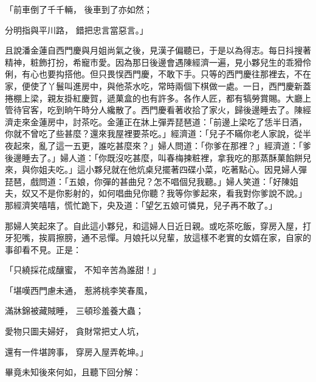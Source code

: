 \begin{showcontents}{}
「前車倒了千千輛，  後車到了亦如然；

分明指與平川路，  錯把忠言當惡言。」

且說潘金蓮自西門慶與月姐尚氣之後，見漢子偏聽已，于是以為得志。每日抖搜著精神，粧飾打扮，希寵巿愛。因為那日後邊會遇陳經濟一遍，見小夥兒生的乖猾伶俐，有心也要抅搭他。但只畏悮西門慶，不敢下手。只等的西門慶往那裡去，不在家，便使了丫鬟叫進房中，與他茶水吃，常時兩個下棋做一處。一日，西門慶新蓋捲棚上梁，親友掛紅慶賀，遞菓盒的也有許多。各作人匠，都有犒勞賞賜。大廳上管待官客，吃到晌午時分人纔散了。西門慶看著收拾了家火，歸後邊睡去了。陳經濟走來金蓮房中，討茶吃。金蓮正在牀上彈弄琵琶道：「前邊上梁吃了恁半日酒，你就不曾吃了些甚麼？還來我屋裡要茶吃。」經濟道：「兒子不瞞你老人家說，從半夜起來，亂了這一五更，誰吃甚麼來？」婦人問道：「你爹在那裡？」經濟道：「爹後邊睡去了。」婦人道：「你既沒吃甚麼，叫春梅揀粧裡，拿我吃的那蒸酥菓餡餅兒來，與你姐夫吃。」這小夥兒就在他炕桌兒擺著四碟小菜，吃著點心。因見婦人彈琵琶，戲問道：「五娘，你彈的甚曲兒？怎不唱個兒我聽。」婦人笑道：「好陳姐夫，奴又不是你影射的，如何唱曲兒你聽？我等你爹起來，看我對你爹說不說。」那經濟笑嘻嘻，慌忙跪下，央及道：「望乞五娘可憐見，兒子再不敢了。」

那婦人笑起來了。自此這小夥兒，和這婦人日近日親。或吃茶吃飯，穿房入屋，打牙犯嘴，挨肩擦膀，通不忌憚。月娘托以兒輩，放這樣不老實的女婿在家，自家的事卻看不見。正是：

「只繞採花成釀蜜，  不知辛苦為誰甜！」

「堪嘆西門慮未通，  惹將桃李笑春風，

滿牀錦被藏賊睡，  三頓珍羞養大蟲；

愛物只圖夫婦好，  貪財常把丈人坑，

還有一件堪誇事，  穿房入屋弄乾坤。」

畢竟未知後來何如，且聽下回分解：




\end{showcontents}
